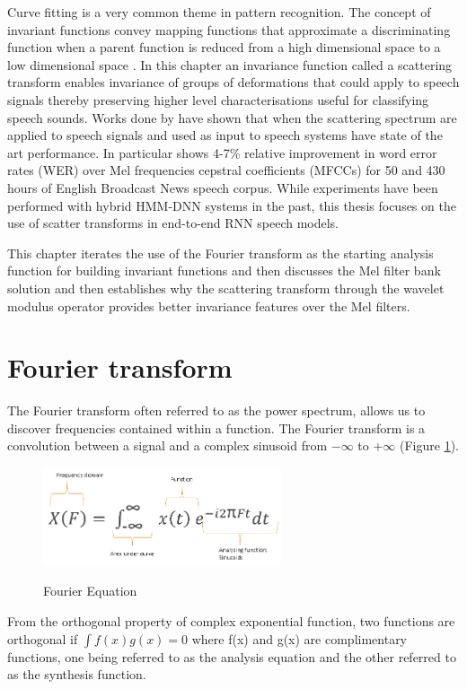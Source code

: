 Curve fitting is a very common theme in pattern recognition. The concept of invariant functions convey mapping functions that approximate a discriminating function when a parent function is reduced from a high dimensional space to a low dimensional space \cite{mallat2016understanding}.  In this chapter an invariance function called a scattering transform  enables invariance of groups of deformations that could apply to speech signals thereby preserving higher level characterisations useful for classifying speech sounds. Works done by \citep{peddinti2014deep,zeghidour2016deep,anden2011multiscale,sainath2014deep} have shown that when the scattering spectrum are applied to speech signals and used as input to speech systems have state of the art performance.  In particular \cite{sainath2014deep} shows 4-7\% relative improvement in word error rates (WER) over Mel frequencies cepstral coefficients (MFCCs) for 50 and 430 hours of English Broadcast News speech corpus.  While experiments have been performed with hybrid HMM-DNN systems in the past, this thesis focuses on the use of scatter transforms in end-to-end RNN speech models.

This chapter iterates the use of the Fourier transform as the starting analysis function for building invariant functions and then discusses the Mel filter bank solution and then establishes why the scattering transform through the wavelet modulus operator provides better invariance features over the Mel filters.

\section{Fourier transform}
The Fourier transform often referred to as the power spectrum, allows us to discover frequencies contained within a function.  The Fourier transform is a convolution between a signal and a complex sinusoid from $-\infty$ to $+\infty$ (Figure \ref{fig_4_1_fourier_eqn}). 

\begin{figure}
\centering
  \includegraphics[width=7cm]{thesis/images/fourier.png}\\
  \caption{Fourier Equation} \label{fig_4_1_fourier_eqn}
\end{figure}
From the orthogonal property of complex exponential function, two functions are orthogonal if $\int f(x)g(x)=0$ where f(x) and g(x) are complimentary functions, one being referred to as the analysis equation and the other referred to as the synthesis function.

